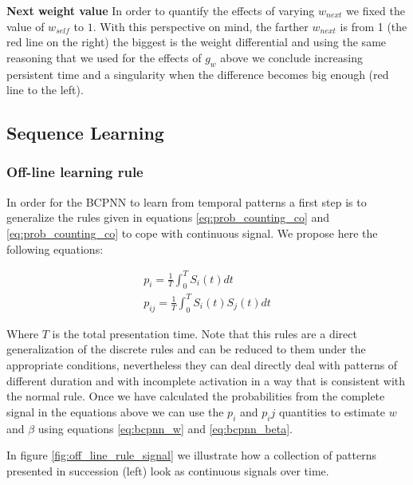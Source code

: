\documentclass[10pt,a4paper]{article}
\begin{document}
\textbf{Next weight value}
In order to quantify the effects of varying $w_{next}$ we fixed the value of $w_{self}$ to $1$. With this perspective on mind, the farther $w_{next}$ is from 1 (the red line on the right) the biggest is the weight differential and using the same reasoning that we used for the effects of $g_w$ above we conclude increasing persistent time and a singularity when the difference becomes big enough (red line to the left). 

\subsection{Sequence Learning}
\subsubsection{Off-line learning rule}

In order for the BCPNN to learn from temporal patterns a first step is to generalize the rules given in equations \ref{eq:prob_counting_co} and \ref{eq:prob_counting_co} to cope with continuous signal. We propose here the following equations:

\begin{align}
p_i = \frac{1}{T}\int_0^{T} S_i(t) dt  \label{eq:bcpnn_off_line_prob} \\
p_{ij} = \frac{1}{T}\int_0^{T} S_i(t) S_j(t) dt \label{eq:bcpnn_off_line_joint} 
\end{align}

Where  $T$ is the total presentation time. Note that this rules are a direct generalization of the discrete rules and can be reduced to them under the appropriate conditions, nevertheless they can deal directly deal with patterns of different duration and with incomplete activation in a way that is consistent with the normal rule. Once we have calculated the probabilities from the complete signal in the equations above we can use the $p_i$ and $p_ij$ quantities to estimate $w$ and $\beta$ using equations \ref{eq:bcpnn_w} and \ref{eq:bcpnn_beta}. 

In figure \ref{fig:off_line_rule_signal} we illustrate how a collection of patterns presented in succession (left) look as continuous signals over time. 
\end{document}
